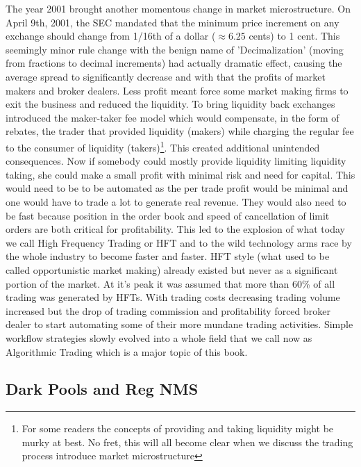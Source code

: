  The year 2001 brought another momentous change in market microstructure. On April 9th, 2001, the SEC mandated that the minimum price increment on any exchange should change from 1/16th of a dollar ($\approx6.25$ cents) to 1 cent. This seemingly  minor rule change with the benign name of 'Decimalization' (moving from fractions to decimal increments) had actually dramatic effect, causing the average spread to significantly decrease and with that the profits of market makers and broker dealers. Less profit meant force some market making firms to exit the business and reduced the liquidity. To bring liquidity back exchanges introduced the maker-taker fee model which would compensate, in the form of rebates, the trader that provided liquidity (makers) while charging the regular fee to the consumer of liquidity (takers)\footnote{For some readers the concepts of providing and taking liquidity might be murky at best. No fret, this will all become clear when we discuss the trading process introduce market microstructure}. This created additional unintended consequences. Now if somebody could mostly provide liquidity limiting liquidity taking, she could make a small profit with minimal risk and need for capital. This would need to be to be automated as the per trade profit would be minimal and one would have to trade a lot to generate real revenue. They would also need to be fast because position in the order book and speed of cancellation of limit orders are both critical for profitability. This led to the explosion of what today we call High Frequency Trading or HFT and to the wild technology arms race by the whole industry to become faster and faster. HFT style (what used to be called opportunistic market making) already existed but never as a significant portion of the market. At it's peak it was assumed that more than 60\% of all trading was generated by HFTs. With trading costs decreasing trading volume increased but the drop of trading commission and profitability forced broker dealer to start automating some of their more mundane trading activities. Simple workflow strategies slowly evolved into a whole field that we call now as Algorithmic Trading which is a major topic of this book.  


\subsection{Dark Pools and Reg NMS}



